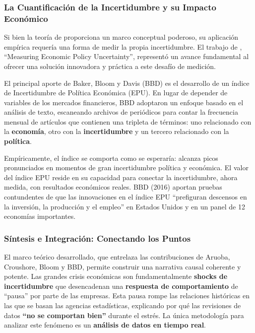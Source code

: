 \documentclass{article}
\begin{document}
\subsubsection{La Cuantificación de la Incertidumbre y su Impacto Económico}

Si bien la teoría de \citet{bloom2009} proporciona un marco conceptual poderoso, su aplicación empírica requería una forma de medir la propia incertidumbre. El trabajo de \citet{baker2016}, ``Measuring Economic Policy Uncertainty'', representó un avance fundamental al ofrecer una solución innovadora y práctica a este desafío de medición.

El principal aporte de Baker, Bloom y Davis (BBD) es el desarrollo de un índice de Incertidumbre de Política Económica (EPU). En lugar de depender de variables de los mercados financieros, BBD adoptaron un enfoque basado en el análisis de texto, escaneando archivos de periódicos para contar la frecuencia mensual de artículos que contienen una tripleta de términos: uno relacionado con la \textbf{economía}, otro con la \textbf{incertidumbre} y un tercero relacionado con la \textbf{política}.

Empíricamente, el índice se comporta como se esperaría: alcanza picos pronunciados en momentos de gran incertidumbre política y económica. El valor del índice EPU reside en su capacidad para conectar la incertidumbre, ahora medida, con resultados económicos reales. BBD (2016) aportan pruebas contundentes de que las innovaciones en el índice EPU ``prefiguran descensos en la inversión, la producción y el empleo'' en Estados Unidos y en un panel de 12 economías importantes.

\subsubsection{Síntesis e Integración: Conectando los Puntos}

El marco teórico desarrollado, que entrelaza las contribuciones de Aruoba, Croushore, Bloom y BBD, permite construir una narrativa causal coherente y potente. Las grandes crisis económicas son fundamentalmente \textbf{shocks de incertidumbre} que desencadenan una \textbf{respuesta de comportamiento} de ``pausa'' por parte de las empresas. Esta pausa rompe las relaciones históricas en las que se basan las agencias estadísticas, explicando por qué las revisiones de datos \textbf{``no se comportan bien''} durante el estrés. La única metodología para analizar este fenómeno es un \textbf{análisis de datos en tiempo real}.
\end{document}
